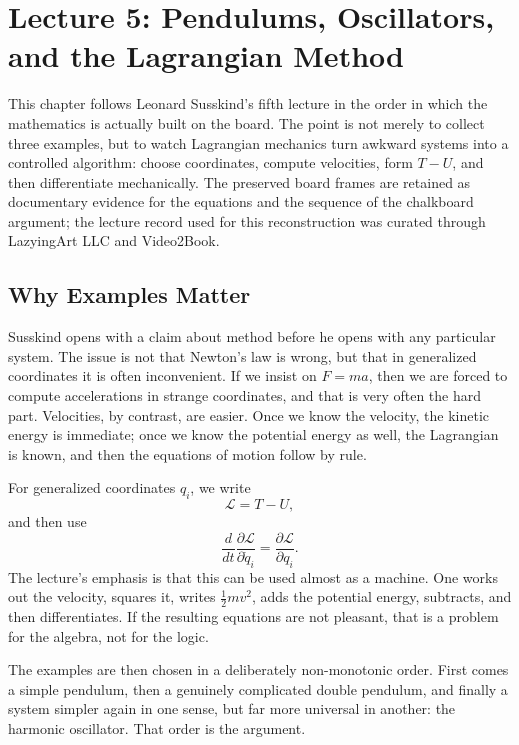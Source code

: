 \chapter{Lecture 5: Pendulums, Oscillators, and the Lagrangian Method}

This chapter follows Leonard Susskind's fifth lecture in the order in which the mathematics is actually built on the board. The point is not merely to collect three examples, but to watch Lagrangian mechanics turn awkward systems into a controlled algorithm: choose coordinates, compute velocities, form \(T-U\), and then differentiate mechanically. The preserved board frames are retained as documentary evidence for the equations and the sequence of the chalkboard argument; the lecture record used for this reconstruction was curated through LazyingArt LLC and Video2Book.

\section{Why Examples Matter}

Susskind opens with a claim about method before he opens with any particular system. The issue is not that Newton's law is wrong, but that in generalized coordinates it is often inconvenient. If we insist on \(F=ma\), then we are forced to compute accelerations in strange coordinates, and that is very often the hard part. Velocities, by contrast, are easier. Once we know the velocity, the kinetic energy is immediate; once we know the potential energy as well, the Lagrangian is known, and then the equations of motion follow by rule.

For generalized coordinates \(q_i\), we write
\begin{equation}
\mathcal{L}=T-U,
\end{equation}
and then use
\begin{equation}
\frac{d}{dt}\frac{\partial\mathcal{L}}{\partial \dot q_i}
=
\frac{\partial\mathcal{L}}{\partial q_i}.
\end{equation}
The lecture's emphasis is that this can be used almost as a machine. One works out the velocity, squares it, writes \(\tfrac12 mv^2\), adds the potential energy, subtracts, and then differentiates. If the resulting equations are not pleasant, that is a problem for the algebra, not for the logic.

The examples are then chosen in a deliberately non-monotonic order. First comes a simple pendulum, then a genuinely complicated double pendulum, and finally a system simpler again in one sense, but far more universal in another: the harmonic oscillator. That order is the argument.

